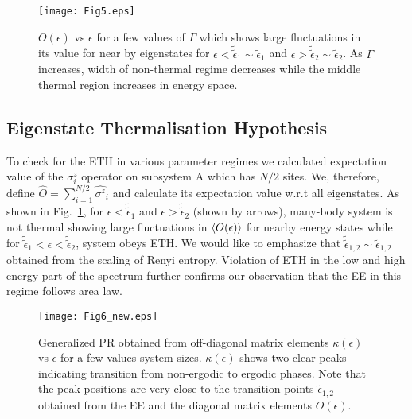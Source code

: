 \documentclass[prl,aps,twocolumn,floats,nofootinbib]{revtex4}
\begin{document}
\begin{figure}[h!]
\begin{center}
\hskip-0.4cm
\texttt{[image: Fig5.eps]}
\caption{$O(\epsilon)$ vs $\epsilon$ for a few values of $\Gamma$ which shows large fluctuations in its value for near by eigenstates for $\epsilon <\tilde{\tilde{\epsilon}}_1\sim \tilde{\epsilon}_1$ and $\epsilon>\tilde{\tilde{\epsilon}}_2\sim \tilde{\epsilon}_2$. As $\Gamma$ increases, width of non-thermal regime decreases while the middle thermal region increases in energy space.}
\label{ETH}
\end{center}
\end{figure}
\subsection{Eigenstate Thermalisation Hypothesis}
To check for the ETH in various parameter regimes we calculated expectation value of the $\sigma^z_i$ operator on subsystem A which has $N/2$ sites. We, therefore,  define $\hat{O} = \sum_{i=1}^{N/2} \hat{\sigma^z}_i$ and calculate its expectation value w.r.t all eigenstates. As shown in Fig.~\ref{ETH}, for $\epsilon < \tilde{\tilde{\epsilon}}_1$ and $\epsilon > \tilde{\tilde{\epsilon}}_2$ (shown by arrows), many-body system is not thermal showing large fluctuations in $\langle O(\epsilon) \rangle$ for nearby energy states  while for $\tilde{\tilde{\epsilon}}_1 < \epsilon< \tilde{\tilde{\epsilon}}_2$, system obeys ETH. We would like to emphasize that $\tilde{\tilde{\epsilon}}_{1,2} \sim \tilde{\epsilon}_{1,2}$ obtained from the scaling of Renyi entropy. Violation of ETH in the low and high energy part of the spectrum further confirms our observation that the EE in this regime follows area law.

\begin{figure}[h!]
\begin{center}
\hskip-0.4cm
\vskip-1cm
\texttt{[image: Fig6\_new.eps]}
\vskip-2cm
\caption{ Generalized PR obtained from off-diagonal matrix elements $\kappa(\epsilon)$ vs $\epsilon$ for a few values system sizes. $\kappa(\epsilon)$ shows two clear peaks indicating transition from non-ergodic to ergodic phases. Note that the peak positions are very close to the transition points $\tilde{\epsilon}_{1,2}$ obtained from the EE and the diagonal matrix elements $O(\epsilon)$.}
\label{ETH2}
\vskip-1cm
\end{center}
\end{figure}
\end{document}
